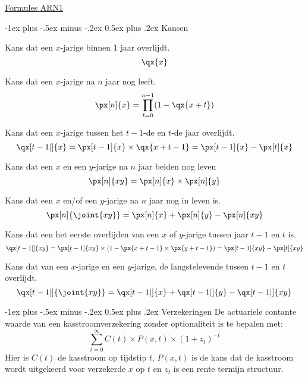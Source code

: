 \documentclass[10pt,landscape]{article}
\makeatletter
\renewcommand{\section}{\@startsection{section}{1}{0mm}%
                                {-1ex plus -.5ex minus -.2ex}%
                                {0.5ex plus .2ex}%
                                {\normalfont\large\bfseries}}
\makeatother
\begin{document}
\raggedright
\footnotesize
\begin{multicols}{3}


\setlength{\premulticols}{1pt}
\setlength{\postmulticols}{1pt}
\setlength{\multicolsep}{1pt}
\setlength{\columnsep}{2pt}

\begin{center}
     \Large{\underline{Formules ARN1}} \\
\end{center}

\section{Kansen}

Kans dat een $x$-jarige binnen 1 jaar overlijdt. 
$$\qx{x}$$

Kans dat een $x$-jarige na $n$ jaar nog leeft.
$$ \px[n]{x} = \prod_{t=0}^{n-1} (1-\qx{x+t}) $$ 

Kans dat een $x$-jarige tussen het $t-1$-de en $t$-de jaar overlijdt.
$$ \qx[t-1|]{x} = \px[t-1]{x} \times \qx{x+t-1} = \px[t-1]{x} - \px[t]{x} $$ 

Kans dat een $x$ en een $y$-jarige na $n$ jaar beiden nog leven
$$ \px[n]{xy} = \px[n]{x} \times \px[n]{y} $$

Kans dat een $x$ en/of een $y$-jarige na $n$ jaar nog in leven is.
$$ \px[n]{\joint{xy}} = \px[n]{x} + \px[n]{y} - \px[n]{xy} $$

Kans dat een het eerste overlijden van een $x$ of $y$-jarige tussen jaar $t-1$ en $t$ is.
$$ \qx[t-1|]{xy} = \px[t-1]{xy} \times ( 1 - \px{x+t-1} \times \px{y+t-1}) = \px[t-1]{xy} - \px[t]{xy} $$

Kans dat van een $x$-jarige en een $y$-jarige, de langstelevende tussen $t-1$ en $t$ overlijdt.
$$ \qx[t-1|]{\joint{xy}} = \qx[t-1|]{x} + \qx[t-1|]{y} - \qx[t-1|]{xy} $$

\section{Verzekeringen}
De actuariele contante waarde van een kasstroomverzekering zonder optionaliteit is te bepalen met:
$$ \sum_{t=0}^{\infty} C(t) \times P(x, t) \times (1 + z_{t})^{-t} $$
Hier is $C(t)$ de kasstroom op tijdstip $t$, $P(x, t)$ is de kans dat de kasstroom wordt uitgekeerd voor verzekerde $x$ op $t$ en $z_{t}$ is een rente termijn structuur.


\end{multicols}
\end{document}

